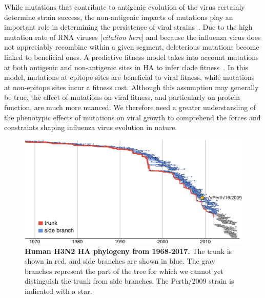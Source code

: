 \documentclass[9pt,twocolumn,twoside]{pnas-new}
\newcommand{\comment}[1]{{\color{red}[\textsl{#1}]}}
\begin{document}
While mutations that contribute to antigenic evolution of the virus certainly determine strain success, the non-antigenic impacts of mutations play an important role in determining the persistence of viral strains~\cite{pybus2007phylogenetic,kucharski2011influenza,strelkowa2012clonal,luksza2014predictive,koelle2015effects}.
Due to the high mutation rate of RNA viruses \comment{citation here} and because the influenza virus does not appreciably recombine within a given segment, deleterious mutations become linked to beneficial ones.
A predictive fitness model takes into account mutations at both antigenic and non-antigenic sites in HA to infer clade fitness~\cite{luksza2014predictive}.
In this model, mutations at epitope sites are beneficial to viral fitness, while mutations at non-epitope sites incur a fitness cost.
Although this assumption may generally be true, the effect of mutations on viral fitness, and particularly on protein function, are much more nuanced.
We therefore need a greater understanding of the phenotypic effects of mutations on viral growth to comprehend the forces and constraints shaping influenza virus evolution in nature.


\begin{figure}
\centering
\includegraphics[width=\linewidth]{figs/H3N2_phylogeny/H3N2_phylogeny.pdf}
\caption{\label{fig:H3N2_phylogeny}
{\bf Human H3N2 HA phylogeny from 1968-2017.}
The trunk is shown in red, and side branches are shown in blue.
The gray branches represent the part of the tree for which we cannot yet distinguish the trunk from side branches.
The Perth/2009 strain is indicated with a star.
}
\end{figure}
\end{document}
